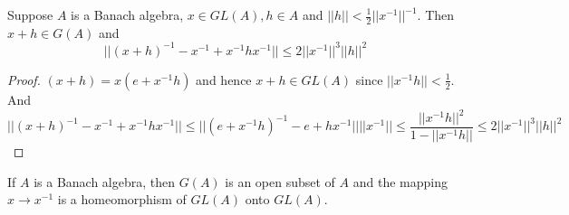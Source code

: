 \documentclass[lang=en, color=blue, ]{elegantbook}
\begin{document}
\begin{theorem}
Suppose $A$ is a Banach algebra, $x\in GL(A), h \in A$ and $||h|| < \tfrac{1}{2}||x^{-1}||^{-1}$. Then $x+h \in G(A)$ and
\[||(x+h)^{-1} - x^{-1} + x^{-1}hx^{-1}|| \leq 2||x^{-1}||^3||h||^2\]
\end{theorem}
\begin{proof}
    $(x+h) = x(e+x^{-1}h)$ and hence $x+h \in GL(A)$ since $||x^{-1}h|| < \tfrac{1}{2}$. And
    \[
    ||(x+h)^{-1} - x^{-1}+x^{-1}hx^{-1}|| \leq ||(e+x^{-1}h)^{-1}-e+hx^{-1}||||x^{-1}|| \leq \dfrac{||x^{-1}h||^2}{1 - ||x^{-1}h||} \leq 2||x^{-1}||^3||h||^2
    \]
\end{proof}

\begin{corollary}
    If $A$ is a Banach algebra, then $G(A)$ is an open subset of $A$ and the mapping $x\to x^{-1}$ is a homeomorphism of $GL(A)$ onto $GL(A)$.
\end{corollary}
\end{document}
